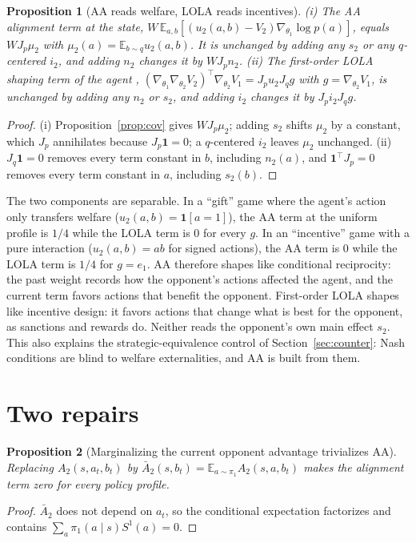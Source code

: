 \documentclass[11pt]{article}
\newtheorem{proposition}{Proposition}
\theoremstyle{remark}
\newcommand{\E}{\mathbb{E}}
\begin{document}
\begin{proposition}[AA reads welfare, LOLA reads incentives]\label{prop:welfare}
(i) The AA alignment term at the state, $W\,\E_{a,b}[(u_2(a,b)-V_2)\nabla_{\theta_1}\log p(a)]$, equals $W J_p\mu_2$ with $\mu_2(a)=\E_{b\sim q}u_2(a,b)$. It is unchanged by adding any $s_2$ or any $q$-centered $i_2$, and adding $n_2$ changes it by $W J_p n_2$.
(ii) The first-order LOLA shaping term of the agent \citep{foerster2018lola}, $(\nabla_{\theta_1}\nabla_{\theta_2}V_2)^\top\nabla_{\theta_2}V_1=J_p u_2 J_q g$ with $g=\nabla_{\theta_2}V_1$, is unchanged by adding any $n_2$ or $s_2$, and adding $i_2$ changes it by $J_p i_2 J_q g$.
\end{proposition}
\begin{proof}
(i) Proposition~\ref{prop:cov} gives $W J_p\mu_2$; adding $s_2$ shifts $\mu_2$ by a constant, which $J_p$ annihilates because $J_p\mathbf 1=0$; a $q$-centered $i_2$ leaves $\mu_2$ unchanged. (ii) $J_q\mathbf 1=0$ removes every term constant in $b$, including $n_2(a)$, and $\mathbf 1^\top J_p=0$ removes every term constant in $a$, including $s_2(b)$.
\end{proof}

The two components are separable. In a ``gift'' game where the agent's action only transfers welfare ($u_2(a,b)=\mathbf 1[a=1]$), the AA term at the uniform profile is $1/4$ while the LOLA term is $0$ for every $g$. In an ``incentive'' game with a pure interaction ($u_2(a,b)=ab$ for signed actions), the AA term is $0$ while the LOLA term is $1/4$ for $g=e_1$. AA therefore shapes like conditional reciprocity: the past weight records how the opponent's actions affected the agent, and the current term favors actions that benefit the opponent. First-order LOLA shapes like incentive design: it favors actions that change what is best for the opponent, as sanctions and rewards do. Neither reads the opponent's own main effect $s_2$. This also explains the strategic-equivalence control of Section~\ref{sec:counter}: Nash conditions are blind to welfare externalities, and AA is built from them.

\section{Two repairs}\label{sec:repair}

\begin{proposition}[Marginalizing the current opponent advantage trivializes AA]\label{prop:marg}
Replacing $A_2(s,a_t,b_t)$ by $\bar A_2(s,b_t)=\E_{a\sim\pi_1}A_2(s,a,b_t)$ makes the alignment term zero for \emph{every} policy profile.
\end{proposition}
\begin{proof}
$\bar A_2$ does not depend on $a_t$, so the conditional expectation factorizes and contains $\sum_a\pi_1(a\mid s)S^1(a)=0$.
\end{proof}
\end{document}

